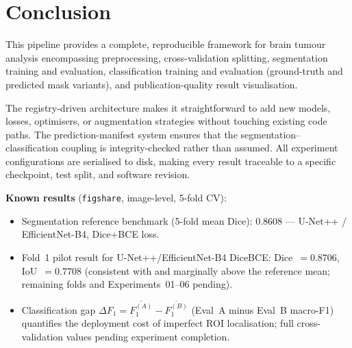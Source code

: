 \documentclass[12pt,a4paper]{article}
\begin{document}
\section{Conclusion}

This pipeline provides a complete, reproducible framework for brain tumour
analysis encompassing preprocessing, cross-validation splitting, segmentation
training and evaluation, classification training and evaluation (ground-truth
and predicted mask variants), and publication-quality result visualisation.

The registry-driven architecture makes it straightforward to add new models,
losses, optimisers, or augmentation strategies without touching existing code
paths.  The prediction-manifest system ensures that the segmentation--classification
coupling is integrity-checked rather than assumed.  All experiment configurations
are serialised to disk, making every result traceable to a specific checkpoint,
test split, and software revision.

\bigskip

\noindent\textbf{Known results} (\texttt{figshare}, image-level, 5-fold CV):

\begin{itemize}[leftmargin=1.5em]
  \item Segmentation reference benchmark (5-fold mean Dice):
    $\mathbf{0.8608}$ — U-Net++ / EfficientNet-B4, Dice+BCE loss.
  \item Fold~1 pilot result for U-Net++/EfficientNet-B4 DiceBCE:
    Dice~$= 0.8706$, IoU~$= 0.7708$ (consistent with and marginally above
    the reference mean; remaining folds and Experiments~01--06 pending).
  \item Classification gap $\Delta F_1 = \overline{F_1^{(A)}} - \overline{F_1^{(B)}}$
    (Eval~A minus Eval~B macro-F1) quantifies the deployment cost of imperfect
    ROI localisation; full cross-validation values pending experiment completion.
\end{itemize}
\end{document}
